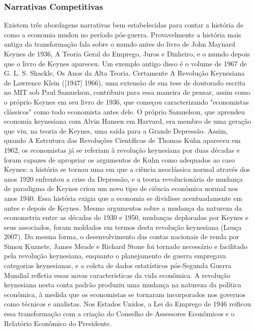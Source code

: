 \documentclass[a4paper,12pt]{article}[abntex2]
\begin{document}
\subsubsection{\textbf{Narrativas Competitivas}}

Existem três abordagens narrativas bem estabelecidas para contar a história de como a economia mudou no período pós-guerra. Provavelmente a história mais antiga da transformação fala sobre o mundo antes do livro de John Maynard Keynes de 1936, A Teoria Geral do Emprego, Juros e Dinheiro, e o mundo depois que o livro de Keynes apareceu. Um exemplo antigo disso é o volume de 1967 de G. L. S. Shackle, Os Anos da Alta Teoria. Certamente A Revolução Keynesiana de Lawrence Klein ([1947] 1966), uma extensão de sua tese de doutorado escrita no MIT sob Paul Samuelson, contribuiu para essa maneira de pensar, assim como o próprio Keynes em seu livro de 1936, que começou caracterizando "economistas clássicos" como todo economista antes dele. O próprio Samuelson, que aprendeu economia keynesiana com Alvin Hansen em Harvard, era membro de uma geração que viu, na teoria de Keynes, uma saída para a Grande Depressão. Assim, quando A Estrutura das Revoluções Científicas de Thomas Kuhn apareceu em 1962, os economistas já se referiam à revolução keynesiana por duas décadas e foram capazes de apropriar os argumentos de Kuhn como adequados ao caso Keynes: a história se tornou uma em que a ciência neoclássica normal através dos anos 1920 enfrentou a crise da Depressão, e a teoria revolucionária de mudança de paradigma de Keynes criou um novo tipo de ciência econômica normal nos anos 1940. Essa história exigia que a economia se dividisse acentuadamente em antes e depois de Keynes. Mesmo argumentos sobre a mudança da natureza da econometria entre as décadas de 1930 e 1950, mudanças deploradas por Keynes e seus associados, foram moldados em termos desta revolução keynesiana (Louça 2007). Da mesma forma, o desenvolvimento das contas nacionais de renda por Simon Kuznets, James Meade e Richard Stone foi tornado necessário e facilitado pela revolução keynesiana, enquanto o planejamento de guerra empregava categorias keynesianas, e a coleta de dados estatísticos pós-Segunda Guerra Mundial refletia essas novas características da vida econômica. A revolução keynesiana nesta conta padrão produziu uma mudança na natureza da política econômica, à medida que os economistas se tornaram incorporados nos governos como técnicos e analistas. Nos Estados Unidos, a Lei do Emprego de 1946 reificou essa transformação com a criação do Conselho de Assessores Econômicos e o Relatório Econômico do Presidente.
\end{document}
